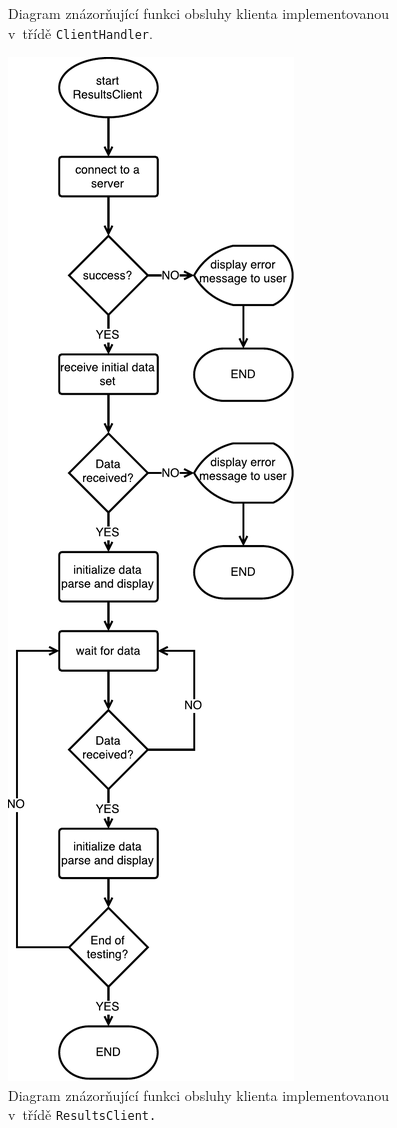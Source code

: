 \begin{figure}
\begin{minipage}{0.45\textwidth}
	  \caption{Diagram znázorňující funkci obsluhy klienta implementovanou v~třídě \texttt{ClientHandler}.}
	  \label{fig:clientHandler_flowchart}
	  \end{minipage}\hfill
	  \begin{minipage}{0.45\textwidth}
	    \centering
	    \includegraphics[height=0.95\textheight, keepaspectratio, center]{obrazky-figures/trview_resultsclient_flowchart.pdf}
	  \caption{Diagram znázorňující funkci obsluhy klienta implementovanou v~třídě \texttt{ResultsClient.}}
	  \label{fig:resultsclient_flowchart}
	  \end{minipage}
	\end{figure}
	
